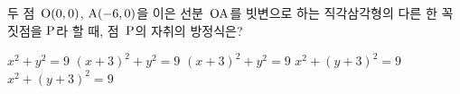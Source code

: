 두 점~$\mathrm{O}(0{,}\mkern3mu\mathopen{}0)$, $\mathrm{A}(-6{,}\mkern3mu\mathopen{}0)$을 이은 선분~$\mathrm{OA}$를 빗변으로 하는 직각삼각형의 다른 한 꼭짓점을 $\mathrm{P}$라 할 때, 점~$\mathrm{P}$의 자취의 방정식은?
\begin{choicesv}{$x^2+y^2=9$ }{$(x+3)^2+y^2=9$ }{$(x+3)^2+y^2=9$ }{$x^2+(y+3)^2=9$ }{$x^2+(y+3)^2=9$ }\end{choicesv}
